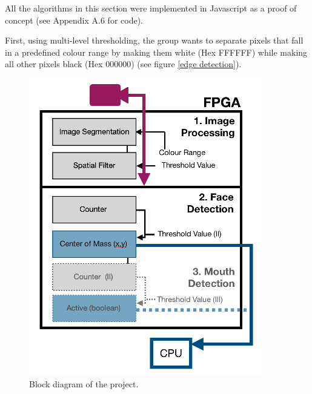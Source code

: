 All the algorithms in this section were implemented in Javascript as a proof of concept (see Appendix A.6 for code).

First, using multi-level thresholding\cite{resma2018multilevel}, the group wants to separate pixels that fall in a predefined colour range by making them white (Hex FFFFFF) while making all other pixels black (Hex 000000) (see figure \ref{edge detection}).



\begin{figure}[h]
\centering
\includegraphics[scale=1]{schematic}
\caption{Block diagram of the project.}
\label{schematic}
\end{figure}

